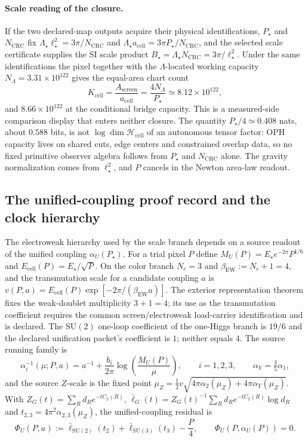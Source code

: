 \paragraph{Scale reading of the closure.}
If the two declared-map outputs acquire their physical identifications,
\(P_\star\) and \(N_{\mathrm{CRC}}\) fix
\(\Lambda_\star\ell_\star^2=3\pi/N_{\mathrm{CRC}}\) and
\(\Lambda_\star a_{\mathrm{cell}}=3\pi P_\star/N_{\mathrm{CRC}}\), and the selected
scale certificate supplies the SI scale product
\(B_\star=\Lambda_\star N_{\mathrm{CRC}}=3\pi/\ell_\star^2\). Under the same
identifications the pixel together with the \(\Lambda\)-located working
capacity \(N_\Lambda=3.31\times10^{122}\) gives the equal-area chart count
\[
K_{\mathrm{cell}}
=\frac{A_{\mathrm{screen}}}{a_{\mathrm{cell}}}
=\frac{4N_\Lambda}{P_\star}
\simeq 8.12\times10^{122},
\]
and \(8.66\times10^{122}\) at the conditional bridge capacity. This is a
measured-side comparison display that enters neither closure. The quantity
\(P_\star/4\simeq0.408\) nats, about \(0.588\) bits, is not
\(\log\dim\mathcal H_{\mathrm{cell}}\) of an autonomous tensor factor: OPH
capacity lives on shared cuts, edge centers and constrained overlap data, so no
fixed primitive observer algebra follows from \(P_\star\) and
\(N_{\mathrm{CRC}}\) alone. The gravity normalization comes from
\(\ell_\star^2\), and \(P\) cancels in the Newton area-law readout.

\subsection{The unified-coupling proof record and the clock hierarchy}
\label{sec:alpha-u-record}

The electroweak hierarchy used by the scale branch depends on a source readout
of the unified coupling \(\alpha_U(P_\star)\). For a trial pixel \(P\) define
\(M_U(P)=E_\star e^{-2\pi}P^{1/6}\) and \(E_{\mathrm{cell}}(P)=E_\star/\sqrt P\).
On the color branch \(N_c=3\) and \(\beta_{\mathrm{EW}}:=N_c+1=4\), and the
transmutation scale for a candidate coupling \(a\) is
\(v(P,a)=E_{\mathrm{cell}}(P)\exp[-2\pi/(\beta_{\mathrm{EW}}a)]\). The exterior
representation theorem fixes the weak-doublet multiplicity \(3+1=4\); its use
as the transmutation coefficient requires the common screen/electroweak
load-carrier identification and is declared. The \(\mathrm{SU}(2)\) one-loop
coefficient of the one-Higgs branch is \(19/6\) and the declared unification
packet's coefficient is \(1\); neither equals \(4\). The source running family
is
\[
\alpha_i^{-1}(\mu;P,a)
=a^{-1}+\frac{b_i}{2\pi}\log\!\left(\frac{M_U(P)}{\mu}\right),
\qquad i=1,2,3,
\qquad
\alpha_Y=\tfrac35\alpha_1,
\]
and the source \(Z\)-scale is the fixed point
\(\mu_Z=\tfrac12 v\sqrt{4\pi\alpha_2(\mu_Z)+4\pi\alpha_Y(\mu_Z)}\). With
\(Z_G(t)=\sum_R d_R e^{-tC_2(R)}\),
\(\bar\ell_G(t)=Z_G(t)^{-1}\sum_R d_R e^{-tC_2(R)}\log d_R\) and
\(t_{2,3}=4\pi^2\alpha_{2,3}(\mu_Z)\), the unified-coupling residual is
\[
\Phi_U(P,a)
:=\bar\ell_{\mathrm{SU}(2)}(t_2)+\bar\ell_{\mathrm{SU}(3)}(t_3)-\frac{P}{4},
\qquad
\Phi_U(P,\alpha_U(P))=0.
\]

